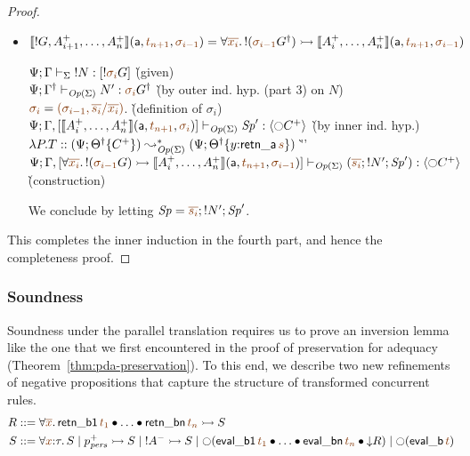 \begin{proof}
\begin{itemize}
\newpage

\item $\opbasic{{!}G,A^+_{i+1},\ldots,A^+_n}{t_{n+1}}{\sigma_{i-1}} = \forall
  \lf{\overline{x_i}}.\, {!}(\lf{\sigma_{i-1}}\opsubst{G}) \lefti
  \opbasic{A^+_i,\ldots,A^+_n}{t_{n+1}}{\sigma_{i-1}}$

  \begin{tabbing}
  $\slst{\Sigma}{\Psi}{\Gamma}{\tbangr{N}}{[{!}\lf{\sigma_i}{G}]}$
  \` (given) 
  \\
  $\slst{\transop{\Sigma}}{\Psi}{\opsubst{\Gamma}}{N'}{\lf{\sigma_i}{\opsubst{G}}}$
  \` (by outer ind. hyp. (part 3)  on $N$) 
  \\
  $\lf{\sigma_i} = \lf{(\sigma_{i-1}, \overline{s_i}/\overline{x_i})}$.
  \` (definition of $\sigma_i$)
  \\
  $\slst{\transop{\Sigma}}{\Psi}{\Gamma, [\opbasic{A^+_i,\ldots,A^+_n}{t_{n+1}}{\sigma_{i}}]}{\Sp'}{\susp{{\ocircle}C^+}}$
  \` (by inner ind. hyp.)
  \\
  $\lambda P.T :: (\Psi; \tackon{\opsubst{\Theta}}{C^+}) \leadsto^*_{\transop{\Sigma}}
   (\Psi; \tackon{\opsubst{\Theta}}{y{:}{\sf retn\_a}\,\lf{s}})$
 \` ''\qquad\qquad~
  \\
  $\slst{\transop{\Sigma}}{\Psi}
    {\Gamma, [\forall \lf{\overline{x_i}}.\, {!}(\lf{\sigma_{i-1}}{G})
                \lefti \opbasic{A^+_i,\ldots,A^+_n}{t_{n+1}}{\sigma_{i-1}}]}
    {(\lf{\overline{s_i}}; \tbangr{N'}; \Sp')}
    {\susp{{\ocircle}C^+}}$
  \\ 
  \` (construction)
  \end{tabbing}
  We conclude  by letting $\Sp = \lf{\overline{s_i}}; \tbangr{N'}; \Sp'$.
\end{itemize}
\smallskip

\noindent
This completes the inner induction in the fourth part, and hence
the completeness proof.
\end{proof}

\subsubsection{Soundness}

Soundness under the parallel translation requires us to prove an
inversion lemma like the one that we first encountered in the proof of
preservation for adequacy (Theorem~\ref{thm:pda-preservation}).
To this end, we describe two new refinements of negative
propositions that capture the structure of transformed concurrent
rules. 
\begin{align*}
R & ::= \forall \lf{\overline{x}}.\,{\sf retn\_b1}\,\lf{t_1} \fuse \ldots \fuse {\sf retn\_bn}\,\lf{t_n} \lefti S
\\
S & ::= \forall \lf{x}{:}\tau.\,S 
   \mid p^+_\mpers \lefti S
   \mid {!}A^- \lefti S
   \mid {\ocircle}({\sf eval\_b1}\,\lf{t_1} \fuse \ldots \fuse {\sf eval\_bn}\,\lf{t_n} 
           \fuse {\downarrow}R)
   \mid {\ocircle}({\sf eval\_b}\,\lf{t})
\end{align*}

